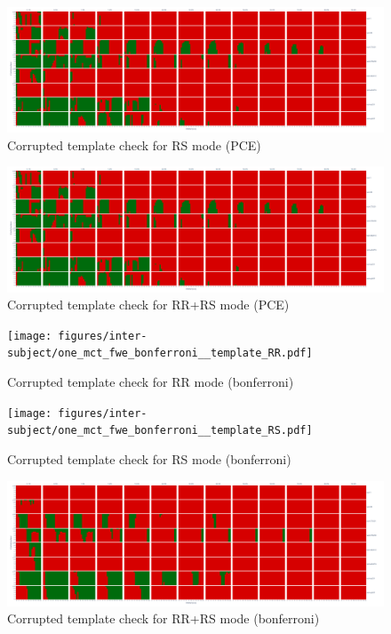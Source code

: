\documentclass{article}
\begin{document}
\begin{figure}
    \centering
    \includegraphics[width=\linewidth]{figures/inter-subject/one_pce_template_RR.pdf}
    \caption{Corrupted template check for RS mode (PCE)}
\end{figure}

\begin{figure}
    \centering
    \includegraphics[width=\linewidth]{figures/inter-subject/one_pce_template_RR.pdf}
    \caption{Corrupted template check for RR+RS mode (PCE)}
\end{figure}

\begin{figure}
    \centering
    \texttt{[image: figures/inter-subject/one\_mct\_fwe\_bonferroni\_\_template\_RR.pdf]}
    \caption{Corrupted template check for RR mode (bonferroni)}
\end{figure}

\begin{figure}
    \centering
    \texttt{[image: figures/inter-subject/one\_mct\_fwe\_bonferroni\_\_template\_RS.pdf]}
    \caption{Corrupted template check for RS mode (bonferroni)}
\end{figure}

\begin{figure}
    \centering
    \includegraphics[width=\linewidth]{figures/inter-subject/one_mct_fwe_bonferroni__template_RR+RS.pdf}
    \caption{Corrupted template check for RR+RS mode (bonferroni)}
\end{figure}
\end{document}
